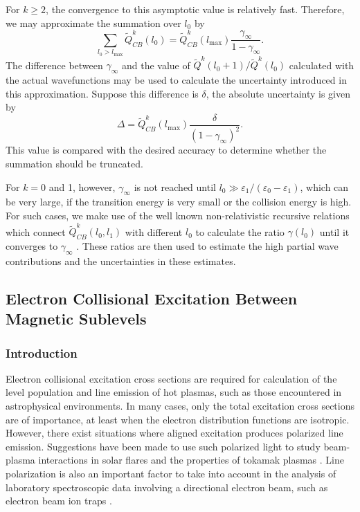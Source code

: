 For $k \ge 2$,
the convergence to this asymptotic value is relatively fast. Therefore, we may
approximate the summation over $l_0$ by
\begin{equation}
\sum_{l_0>l_\mathrm{max}}\tilde{Q}^k_{CB}(l_0) =
\tilde{Q}^k_{CB}(l_\mathrm{max})\frac{\gamma_{\infty}}{1-\gamma_{\infty}}. 
\end{equation}
The difference between $\gamma_{\infty}$ and the value of 
$\tilde{Q}^k(l_0+1)/\tilde{Q}^k(l_0)$ calculated with the actual wavefunctions
may be used to calculate the uncertainty introduced in this
approximation. Suppose this 
difference is $\delta$, the absolute uncertainty is given by
\begin{equation}
\Delta = \tilde{Q}^k_{CB}(l_\mathrm{max})\frac{\delta}{(1-\gamma_{\infty})^2}.
\end{equation}
This value is compared with the desired accuracy to determine whether the
summation should be truncated.

For $k = 0$ and 1, however, $\gamma_\infty$ is not reached until $l_0 \gg
\varepsilon_1/(\varepsilon_0-\varepsilon_1)$, which can be very large, if the
transition energy is very small or the collision
energy is high. For such cases, we make use of the well known non-relativistic
recursive relations which connect
$\tilde{Q}^k_{CB}(l_0,l_1)$ with different $l_0$ to calculate the ratio
$\gamma(l_0)$ until it converges to 
$\gamma_{\infty}$ \cite{burgess:1974a}. These ratios are then used to estimate
the high partial wave contributions and the uncertainties in these estimates.

\subsection{Electron Collisional Excitation Between Magnetic Sublevels}
\subsubsection{Introduction}
Electron collisional excitation cross sections are required for calculation of
the level population and line emission of hot plasmas, such as those encountered
in astrophysical environments. In many cases, only the total excitation cross
sections are of importance, at least when the electron distribution functions
are isotropic. However, there exist situations where aligned excitation produces
polarized line emission. Suggestions have been made to use such polarized light
to study beam-plasma interactions in solar flares \citep{haug:1972a, haug:1981a}
and the properties of tokamak plasmas \citep{fujimoto:1996a}. Line polarization
is also an important factor to take into account in the analysis of laboratory
spectroscopic data involving a directional electron beam, such as electron beam
ion traps \citep{beiersdorfer:1996a, takacs:1996a}. 

